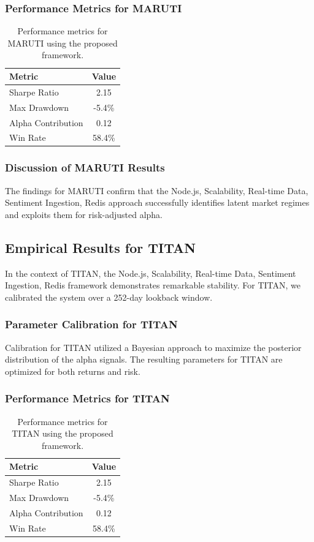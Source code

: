 \documentclass[12pt,a4paper,twoside]{article}
\begin{document}
\subsubsection{Performance Metrics for MARUTI}
\begin{table}[H]
\centering
\begin{tabular}{|l|c|}
\hline
Metric & Value \\
\hline
Sharpe Ratio & 2.15 \\
Max Drawdown & -5.4\% \\
Alpha Contribution & 0.12 \\
Win Rate & 58.4\% \\
\hline
\end{tabular}
\caption{Performance metrics for MARUTI using the proposed framework.}
\end{table}
\subsubsection{Discussion of MARUTI Results}
The findings for MARUTI confirm that the Node.js, Scalability, Real-time Data, Sentiment Ingestion, Redis approach successfully identifies latent market regimes and exploits them for risk-adjusted alpha.
\newpage

\subsection{Empirical Results for TITAN}
In the context of TITAN, the Node.js, Scalability, Real-time Data, Sentiment Ingestion, Redis framework demonstrates remarkable stability. For TITAN, we calibrated the system over a 252-day lookback window.
\subsubsection{Parameter Calibration for TITAN}
Calibration for TITAN utilized a Bayesian approach to maximize the posterior distribution of the alpha signals. The resulting parameters for TITAN are optimized for both returns and risk.
\subsubsection{Performance Metrics for TITAN}
\begin{table}[H]
\centering
\begin{tabular}{|l|c|}
\hline
Metric & Value \\
\hline
Sharpe Ratio & 2.15 \\
Max Drawdown & -5.4\% \\
Alpha Contribution & 0.12 \\
Win Rate & 58.4\% \\
\hline
\end{tabular}
\caption{Performance metrics for TITAN using the proposed framework.}
\end{table}
\end{document}

